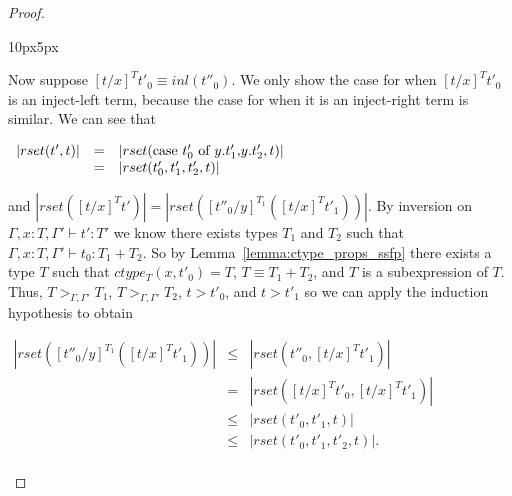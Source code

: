 \begin{proof}
\begin{changemargin}{10px}{5px}
\begin{itemize}
  Now suppose $[t/x]^T t'_0 \equiv inl(t''_0)$.  We only show the case for when $[t/x]^T t'_0$ is an inject-left
  term, because the case for when it is an inject-right term is similar.  We can see that 
  \begin{center}
    \begin{math}
      \begin{array}{lll}
        |rset(t',t)| & = & |rset(\mbox{case}\ t'_0\ \text{of}\ y\text{.}t'_1\text{,}y\text{.}t'_2,t)|\\
        & = & |rset(t'_0,t'_1,t'_2,t)|
      \end{array}
    \end{math}
  \end{center}
  and $|rset([t/x]^T t')| = |rset([t''_0/y]^{T_1} ([t/x]^T t'_1))|$.    By inversion on $\Gamma,x:T,\Gamma' \vdash t':T'$ we know there exists
  types $T_1$ and $T_2$ such that $\Gamma,x:T,\Gamma' \vdash t_0:T_1+T_2$.
  So by Lemma~\ref{lemma:ctype_props_ssfp} there exists a type $T$ such that $ctype_T (x,t'_0) = T$, $T \equiv T_1+T_2$, and $T$ is a 
  subexpression of $T$.  Thus, $T >_{\Gamma,\Gamma'} T_1$, $T >_{\Gamma,\Gamma'} T_2$, $t > t'_0$, and $t > t'_1$ so we can apply the induction hypothesis
  to obtain 
  \begin{center}
    \begin{math}
      \begin{array}{lll}
        |rset([t''_0/y]^{T_1} ([t/x]^T t'_1))| & \leq & |rset(t''_0,[t/x]^T t'_1)|\\
        & =    & |rset([t/x]^T t'_0,[t/x]^T t'_1)|\\
        & \leq & |rset(t'_0, t'_1, t)|\\
        & \leq & |rset(t'_0, t'_1, t'_2, t)|.\\
      \end{array}
    \end{math}
  \end{center}
     

\end{itemize}
\end{changemargin}
\end{proof}
